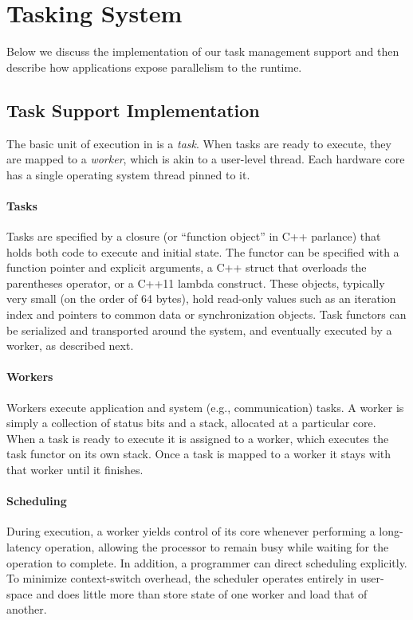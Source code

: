 \section{Tasking System}

Below we discuss the implementation of our task management support and then
describe how applications expose parallelism to the \Grappa runtime.

\subsection{Task Support Implementation}

The basic unit of execution in \Grappa is a {\em task}. When tasks are ready to
execute, they are mapped to a {\em worker}, which is akin to a user-level
thread. Each hardware core has a single operating system thread pinned to it.

\paragraph{Tasks} 
Tasks are specified by a closure (or ``function object'' in C++ parlance) that holds both code to execute and initial state. The functor can be specified with a function pointer and explicit arguments, a C++ struct that overloads the parentheses operator, or a C++11 lambda construct. These objects, typically very small (on the order of 64 bytes), hold read-only values such as an iteration index and pointers to common data or synchronization objects. Task functors can be serialized and transported around the system, and eventually executed by a worker, as described next.

\paragraph{Workers} Workers execute application and system (e.g.,
communication) tasks. A worker is simply a collection of status bits and a
stack, allocated at a particular core. When a task is ready to execute it
is assigned to a worker, which executes the task functor on its own stack. 
Once a task is mapped to a worker it stays with that worker until it finishes.

\paragraph{Scheduling} During execution, a worker yields control of its core
whenever performing a long-latency operation, allowing the processor to
remain busy while waiting for the operation to complete. In addition, a
programmer can direct scheduling explicitly.
To minimize context-switch overhead, the \Grappa scheduler
operates entirely in user-space and does little more than store state of one
worker and load that of another.

